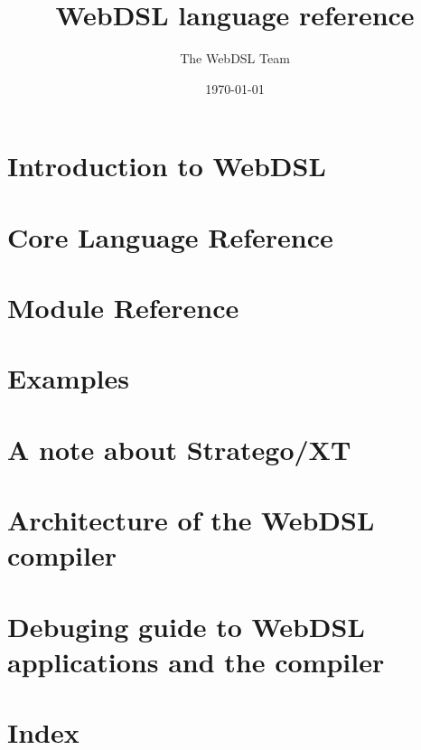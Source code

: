 \documentclass[10pt,a4paper]{memoir}
\title{WebDSL language reference}
\author{The WebDSL Team}
\date{\today}
\begin{document}
\frontmatter
\maketitle
\tableofcontents 
\mainmatter
\part{Introduction to WebDSL}


\part{Core Language Reference}


\part{Module Reference}



\backmatter
\appendix
\part{Examples}
\part{A note about Stratego/XT}

\part{Architecture of the WebDSL compiler}
\part{Debuging guide to WebDSL applications and the compiler}
\part{Index}
\printindex
\end{document}
